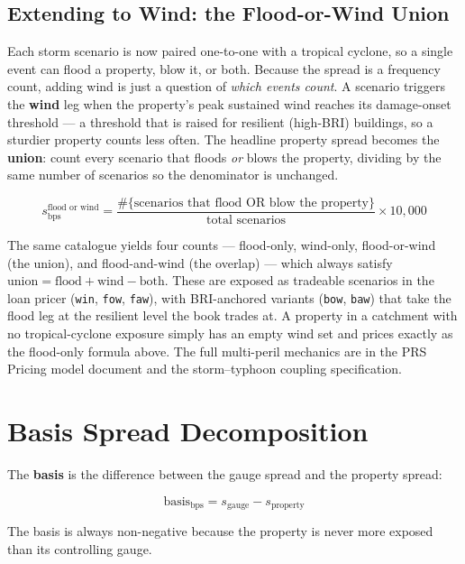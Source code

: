 \documentclass[11pt,a4paper]{article}
\begin{document}
\subsection{Extending to Wind: the Flood-or-Wind Union}

Each storm scenario is now paired one-to-one with a tropical cyclone, so a
single event can flood a property, blow it, or both. Because the spread is a
frequency count, adding wind is just a question of \emph{which events count}.
A scenario triggers the \textbf{wind} leg when the property's peak sustained
wind reaches its damage-onset threshold --- a threshold that is raised for
resilient (high-BRI) buildings, so a sturdier property counts less often. The
headline property spread becomes the \textbf{union}: count every scenario that
floods \emph{or} blows the property, dividing by the same number of scenarios so
the denominator is unchanged.

\[
  s^{\text{flood or wind}}_{\mathrm{bps}}
  = \frac{\#\{\text{scenarios that flood OR blow the property}\}}{\text{total scenarios}}
  \times 10{,}000
\]

\noindent The same catalogue yields four counts --- flood-only, wind-only,
flood-or-wind (the union), and flood-and-wind (the overlap) --- which always
satisfy $\text{union} = \text{flood} + \text{wind} - \text{both}$. These are
exposed as tradeable scenarios in the loan pricer (\texttt{win}, \texttt{fow},
\texttt{faw}), with BRI-anchored variants (\texttt{bow}, \texttt{baw}) that take
the flood leg at the resilient level the book trades at. A property in a
catchment with no tropical-cyclone exposure simply has an empty wind set and
prices exactly as the flood-only formula above. The full multi-peril mechanics
are in the PRS Pricing model document and the storm--typhoon coupling
specification.


\section{Basis Spread Decomposition}

The \textbf{basis} is the difference between the gauge spread and the
property spread:

\[
  \text{basis}_{\mathrm{bps}} = s_{\mathrm{gauge}} - s_{\mathrm{property}}
\]

The basis is always non-negative because the property is never more
exposed than its controlling gauge.
\end{document}
